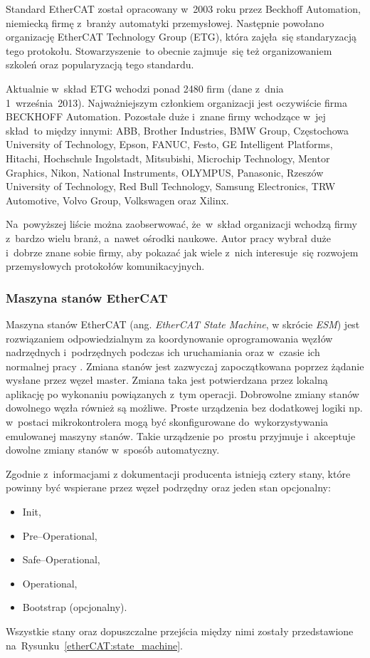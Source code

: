 Standard EtherCAT został opracowany w~2003 roku przez Beckhoff Automation, niemiecką firmę z~branży automatyki przemysłowej. Następnie powołano organizację EtherCAT Technology Group (ETG), która zajęła~się standaryzacją tego protokołu. Stowarzyszenie~to obecnie zajmuje~się też organizowaniem szkoleń oraz popularyzacją tego standardu. 

Aktualnie w~skład ETG wchodzi ponad 2480 firm (dane z~dnia 1~września~2013). Najważniejszym członkiem organizacji jest oczywiście firma BECKHOFF Automation. Pozostałe duże i~znane firmy wchodzące w~jej skład~to między innymi: ABB, Brother Industries, BMW Group, Częstochowa University of Technology, Epson, FANUC, Festo, GE Intelligent Platforms, Hitachi, Hochschule Ingolstadt, Mitsubishi, Microchip Technology, Mentor Graphics, Nikon, National Instruments, OLYMPUS, Panasonic, Rzeszów University of Technology, Red Bull Technology, Samsung Electronics, TRW Automotive, Volvo Group, Volkswagen oraz Xilinx.

Na~powyższej liście można zaobserwować, że~w~skład organizacji wchodzą firmy z~bardzo wielu branż, a~nawet ośrodki naukowe. Autor pracy wybrał duże i~dobrze znane sobie firmy, aby pokazać jak wiele z~nich interesuje~się rozwojem przemysłowych protokołów komunikacyjnych.

\subsubsection{Maszyna stanów EtherCAT}
Maszyna stanów EtherCAT (ang. \textit{EtherCAT State Machine}, w skrócie \textit{ESM}) jest rozwiązaniem odpowiedzialnym za koordynowanie oprogramowania węzłów nadrzędnych i~podrzędnych podczas ich uruchamiania oraz w~czasie ich normalnej pracy \cite{FPGA_Xilinx}.
Zmiana stanów jest zazwyczaj zapoczątkowana poprzez żądanie wysłane przez węzeł master. Zmiana taka jest potwierdzana przez lokalną aplikację po wykonaniu powiązanych z~tym operacji. Dobrowolne zmiany stanów dowolnego węzła również są możliwe.
Proste urządzenia bez dodatkowej logiki np. w~postaci mikrokontrolera mogą być skonfigurowane do~wykorzystywania emulowanej maszyny stanów. Takie urządzenie po~prostu przyjmuje i~akceptuje dowolne zmiany stanów w~sposób automatyczny.

Zgodnie z~informacjami z dokumentacji producenta istnieją cztery stany, które powinny być wspierane przez węzeł podrzędny oraz jeden stan opcjonalny:
\begin{itemize}
\item Init,
\item Pre--Operational,
\item Safe--Operational,
\item Operational,
\item Bootstrap (opcjonalny).
\end{itemize}
Wszystkie stany oraz dopuszczalne przejścia między nimi zostały przedstawione na~Rysunku~\ref{etherCAT:state_machine}.

